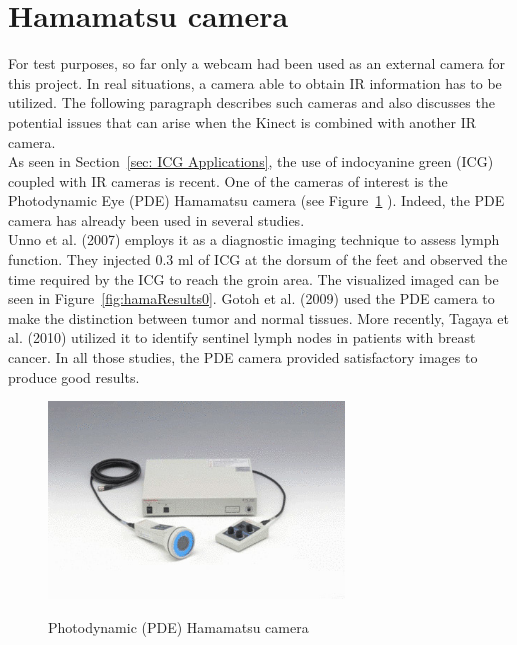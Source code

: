 \section{Hamamatsu camera}
\label{sec:Hamamatsu camera}

For test purposes, so far only a webcam had been used as an external camera for this project. In real situations, a camera able to obtain IR information has to be utilized. The following paragraph describes such cameras and also discusses the potential issues that can arise when the Kinect is combined with another IR camera.\\

As seen in Section~\ref{sec: ICG Applications}, the use of indocyanine green (ICG) coupled with IR cameras is recent. One of the cameras of interest is the Photodynamic Eye (PDE) Hamamatsu camera (see Figure~\ref{fig:hamamatsu} \cite{pde}). Indeed, the PDE camera has already been used in several studies. \\

Unno et al. (2007) \cite{unno_quantitative_2008} employs it as a diagnostic imaging technique to assess lymph function. They injected 0.3 ml of ICG at the dorsum of the feet and observed the time required by the ICG to reach the groin area. The visualized imaged can be seen in Figure~\ref{fig:hamaResults0}. Gotoh et al. (2009) \cite{gotoh_novel_2009} used the PDE camera to make the distinction between tumor and normal tissues. More recently, Tagaya et al. (2010) \cite{tagaya_non-invasive_2010} utilized it to identify sentinel lymph nodes in patients with breast cancer. In all those studies, the PDE camera provided satisfactory images to produce good results.\\

\begin{figure}
\caption{Photodynamic (PDE) Hamamatsu camera}
\centering
    \includegraphics[width=0.7\textwidth]{images/hamamatsu.jpg}
\label{fig:hamamatsu}
\end{figure}

